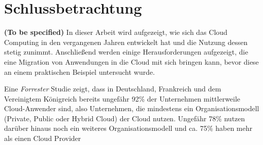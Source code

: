 \chapter{Schlussbetrachtung}
\textbf{(To be specified)}
In dieser Arbeit wird aufgezeigt, wie sich das Cloud Computing in den vergangenen Jahren entwickelt hat und die Nutzung dessen stetig zunimmt. Anschließend werden einige Herausforderungen aufgezeigt, die eine Migration von Anwendungen in die Cloud mit sich bringen kann, bevor diese an einem praktischen Beispiel untersucht wurde.

Eine \textit{Forrester} Studie zeigt, dass in Deutschland, Frankreich und dem Vereinigtem Königreich bereits ungefähr 92\% der Unternehmen mittlerweile Cloud-Anwender sind, also Unternehmen, die mindestens ein Organisationsmodell (Private, Public oder Hybrid Cloud) der Cloud nutzen. Ungefähr 78\% nutzen darüber hinaus noch ein weiteres Organisationsmodell und ca. 75\% haben mehr als einen Cloud Provider \cite[Vgl.][S. 4]{Rajamani2022} \pagebreak